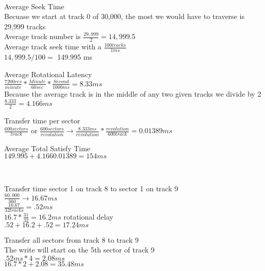 \documentclass[12pt,largemargins]{homework}
\begin{document}
\\
\begin{alphaparts}
	\item 
	Average Seek Time\\
	Becuase we start at track 0 of 30,000, the most we would have to traverse is 29,999 tracks\\
	Average track number is $ \frac{29,999}{2} = 14,999.5$\\
	Average track seek time with a $ \frac{100 tracks}{1 ms} $\\
	$ 14,999.5/100 = $ 149.995 ms\\
	\item 
	Average Rotational Latency\\
	$ \frac{7200 rev}{minute} * \frac{Minute}{60 sec} * \frac{Second}{1000ms} = 8.33ms$\\
	Because the average track is in the middle of any two given tracks we divide by 2\\
	$ \frac{8.333}{2} = 4.16\overline{6} ms$\\
	\item 
	Transfer time per sector\\
	$ \frac{600 sectors}{track} $ or $ \frac{600 sectors}{revolution} \rightarrow \frac{8.333ms}{revolution} * \frac{revolution}{600 track} = 0.01389 ms$\\
	\item
	Average Total Satisfy Time\\
	$ 149.995 + 4.166 0.01389 = 154 ms$\\
	
\end{alphaparts}

\\
\begin{alphaparts}
	\item 
	Transfer time sector 1 on track 8 to sector 1 on track 9\\
	$ \frac{60,000}{360} \rightarrow 16.67ms $\\
	$ \frac{16.67}{32 tracks} = .52 ms $\\
	$ 16.7 * \frac{31}{32} = 16.2 ms $ rotational delay\\
	$ .52 + 16.2 + .52 = 17.24 ms $\\
	\item 
	Transfer all sectors from track 8 to track 9\\
	The write will start on the 5th sector of track 9\\
	$ .52 ms * 4 = 2.08 ms $\\
	$ 16.7 * 2 + 2.08 = 35.48 ms $\\
\end{alphaparts}
\end{document}
